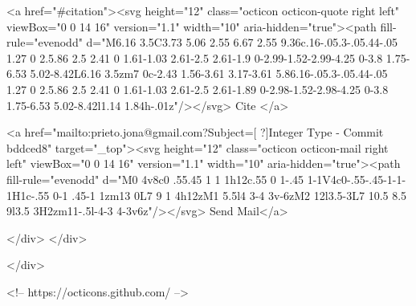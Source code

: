       <a  href="#citation"><svg height="12" class="octicon octicon-quote right left" viewBox="0 0 14 16" version="1.1" width="10" aria-hidden="true"><path fill-rule="evenodd" d="M6.16 3.5C3.73 5.06 2.55 6.67 2.55 9.36c.16-.05.3-.05.44-.05 1.27 0 2.5.86 2.5 2.41 0 1.61-1.03 2.61-2.5 2.61-1.9 0-2.99-1.52-2.99-4.25 0-3.8 1.75-6.53 5.02-8.42L6.16 3.5zm7 0c-2.43 1.56-3.61 3.17-3.61 5.86.16-.05.3-.05.44-.05 1.27 0 2.5.86 2.5 2.41 0 1.61-1.03 2.61-2.5 2.61-1.89 0-2.98-1.52-2.98-4.25 0-3.8 1.75-6.53 5.02-8.42l1.14 1.84h-.01z"/></svg> Cite
      </a>

      <a href="mailto:prieto.jona@gmail.com?Subject=[ ?]Integer Type - Commit bddced8" target="_top"><svg height="12" class="octicon octicon-mail right left" viewBox="0 0 14 16" version="1.1" width="10" aria-hidden="true"><path fill-rule="evenodd" d="M0 4v8c0 .55.45 1 1 1h12c.55 0 1-.45 1-1V4c0-.55-.45-1-1-1H1c-.55 0-1 .45-1 1zm13 0L7 9 1 4h12zM1 5.5l4 3-4 3v-6zM2 12l3.5-3L7 10.5 8.5 9l3.5 3H2zm11-.5l-4-3 4-3v6z"/></svg> Send Mail</a>

    </div>
  </div>

</div>

<!-- https://octicons.github.com/ -->





